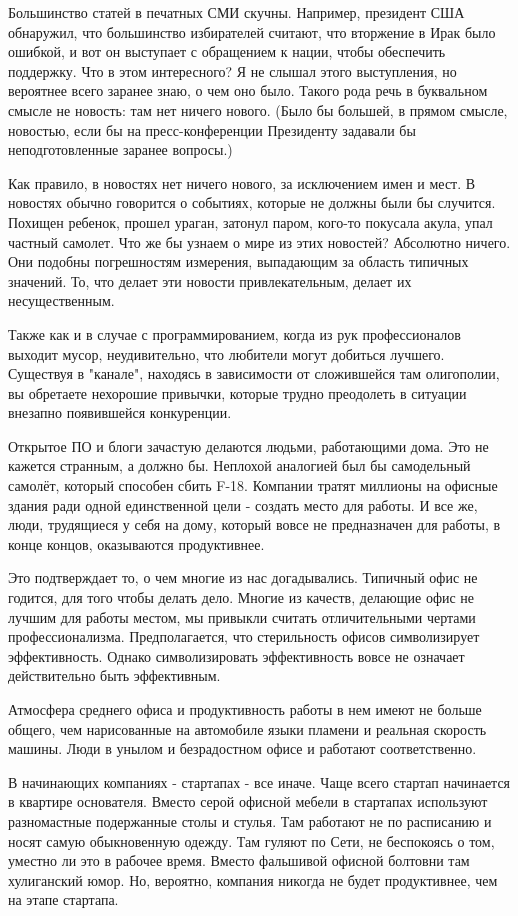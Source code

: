 \documentclass[ebook,12pt,oneside,openany]{memoir}
\begin{document}
Большинство статей в печатных СМИ скучны. Например, президент США
обнаружил, что большинство избирателей считают, что вторжение в Ирак
было ошибкой, и вот он выступает с обращением к нации, чтобы
обеспечить поддержку. Что в этом интересного? Я не слышал этого
выступления, но вероятнее всего заранее знаю, о чем оно было. Такого
рода речь в буквальном смысле не новость: там нет ничего нового. (Было
бы большей, в прямом смысле, новостью, если бы на пресс-конференции
Президенту задавали бы неподготовленные заранее вопросы.)

Как правило, в новостях нет ничего нового, за исключением имен и мест.
В новостях обычно говорится о событиях, которые не должны были бы
случится. Похищен ребенок, прошел ураган, затонул паром, кого-то
покусала акула, упал частный самолет. Что же бы узнаем о мире из этих
новостей? Абсолютно ничего. Они подобны погрешностям измерения,
выпадающим за область типичных значений. То, что делает эти новости
привлекательным, делает их несущественным.

Также как и в случае с программированием, когда из рук профессионалов
выходит мусор, неудивительно, что любители могут добиться лучшего.
Существуя в "канале", находясь в зависимости от сложившейся там
олигополии, вы обретаете нехорошие привычки, которые трудно преодолеть
в ситуации внезапно появившейся конкуренции.

Открытое ПО и блоги зачастую делаются людьми, работающими дома. Это не
кажется странным, а должно бы. Неплохой аналогией был бы самодельный
самолёт, который способен сбить F-18. Компании тратят миллионы на
офисные здания ради одной единственной цели - создать место для
работы. И все же, люди, трудящиеся у себя на дому, который вовсе не
предназначен для работы, в конце концов, оказываются продуктивнее.

Это подтверждает то, о чем многие из нас догадывались. Типичный офис
не годится, для того чтобы делать дело. Многие из качеств, делающие
офис не лучшим для работы местом, мы привыкли считать отличительными
чертами профессионализма. Предполагается, что стерильность офисов
символизирует эффективность. Однако символизировать эффективность
вовсе не означает действительно быть эффективным.

Атмосфера среднего офиса и продуктивность работы в нем имеют не больше
общего, чем нарисованные на автомобиле языки пламени и реальная
скорость машины. Люди в унылом и безрадостном офисе и работают
соответственно.

В начинающих компаниях - стартапах - все иначе. Чаще всего стартап
начинается в квартире основателя. Вместо серой офисной мебели в
стартапах используют разномастные подержанные столы и стулья. Там
работают не по расписанию и носят самую обыкновенную одежду. Там
гуляют по Сети, не беспокоясь о том, уместно ли это в рабочее время.
Вместо фальшивой офисной болтовни там хулиганский юмор. Но, вероятно,
компания никогда не будет продуктивнее, чем на этапе стартапа.
\end{document}
